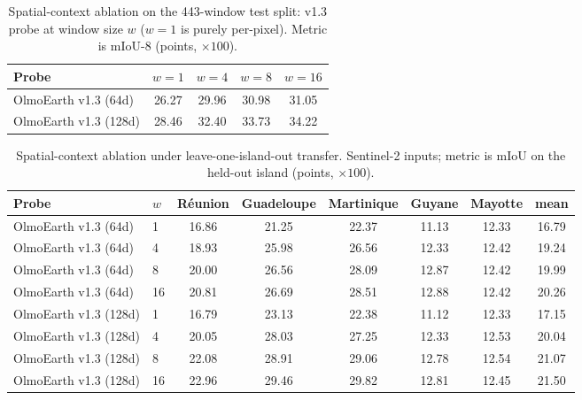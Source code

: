 \begin{table}[t]
    \centering
    \small
    \setlength{\tabcolsep}{4pt}
    \begin{tabular}{l|cccc}
        Probe & $w=1$ & $w=4$ & $w=8$ & $w=16$\\
        \hline
        OlmoEarth v1.3 (64d) & 26.27 & 29.96 & 30.98 & 31.05\\
        OlmoEarth v1.3 (128d) & 28.46 & 32.40 & 33.73 & 34.22\\
    \end{tabular}
    \caption{Spatial-context ablation on the 443-window \planteur test split:
    \olmoearth v1.3 probe at window size $w$ ($w=1$ is purely per-pixel). Metric
    is mIoU-8 (points, $\times 100$).}
    \label{tab:planteur-window-size-ablation}
\end{table}

\begin{table}[t]
    \centering
    \small
    \setlength{\tabcolsep}{4pt}
    \begin{tabular}{ll|ccccc|c}
        Probe & $w$ & R\'eunion & Guadeloupe & Martinique & Guyane & Mayotte & mean\\
        \hline
        OlmoEarth v1.3 (64d) & 1 & 16.86 & 21.25 & 22.37 & 11.13 & 12.33 & 16.79\\
        OlmoEarth v1.3 (64d) & 4 & 18.93 & 25.98 & 26.56 & 12.33 & 12.42 & 19.24\\
        OlmoEarth v1.3 (64d) & 8 & 20.00 & 26.56 & 28.09 & 12.87 & 12.42 & 19.99\\
        OlmoEarth v1.3 (64d) & 16 & 20.81 & 26.69 & 28.51 & 12.88 & 12.42 & 20.26\\
        \hline
        OlmoEarth v1.3 (128d) & 1 & 16.79 & 23.13 & 22.38 & 11.12 & 12.33 & 17.15\\
        OlmoEarth v1.3 (128d) & 4 & 20.05 & 28.03 & 27.25 & 12.33 & 12.53 & 20.04\\
        OlmoEarth v1.3 (128d) & 8 & 22.08 & 28.91 & 29.06 & 12.78 & 12.54 & 21.07\\
        OlmoEarth v1.3 (128d) & 16 & 22.96 & 29.46 & 29.82 & 12.81 & 12.45 & 21.50\\
        \hline
    \end{tabular}
    \caption{Spatial-context ablation under leave-one-island-out transfer.
    Sentinel-2 inputs; metric is mIoU on the held-out island (points,
    $\times 100$).}
    \label{tab:planteur-loio-window-size}
\end{table}

